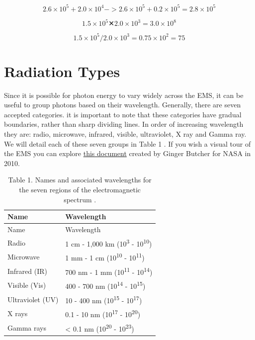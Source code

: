 \documentclass[
]{book}
\begin{document}
\begin{equation}
2.6 × 10 ^{5} + 2.0 × 10 ^{4}   ->
2.6 × 10 ^{5} + 0.2 × 10 ^{5} = 2.8 × 10 ^{5} 
\label{eq:SI-add}
\end{equation}

\begin{equation}
1.5 × 10 ^{5} ✕ 2.0 × 10 ^{3} = 3.0 × 10 ^{8} 
\label{eq:SI-multiply}
\end{equation}

\begin{equation}
1.5 × 10 ^{5} / 2.0 × 10 ^{3} = 0.75 × 10 ^{2} = 75
\label{eq:SI-divide}
\end{equation}

\hypertarget{radiation-types}{%
\section{Radiation Types}\label{radiation-types}}

Since it is possible for photon energy to vary widely across the
EMS, it can be useful to group photons based on their wavelength.
Generally, there are seven accepted categories. it is important to note
that these categories have gradual boundaries, rather than sharp
dividing lines. In order of increasing wavelength they are: radio,
microwave, infrared, visible, ultraviolet, X ray and Gamma ray. We will
detail each of these seven groups in Table 1 \citep{zwinkels_encyclopedia_2020}. If you
wish a visual tour of the EMS you can explore \href{https://books.google.ca/books?id=DfLPpxogdM4C\&pg=PP1\#v=onepage\&q\&f=false}{this
document}
created by Ginger Butcher for NASA in 2010.

\begin{longtable}[]{@{}ll@{}}
\caption{Table 1. Names and associated wavelengths for the seven regions of the
electromagnetic spectrum \citep{zwinkels_encyclopedia_2020}.}\tabularnewline
\toprule\noalign{}
Name & Wavelength \\
\midrule\noalign{}
\endfirsthead
\toprule\noalign{}
Name & Wavelength \\
\midrule\noalign{}
\endhead
\bottomrule\noalign{}
\endlastfoot
Radio & 1 cm - 1,000 km (10\textsuperscript{3} - 10\textsuperscript{10}) \\
Microwave & 1 mm - 1 cm (10\textsuperscript{10} - 10\textsuperscript{11}) \\
Infrared (IR) & 700 nm - 1 mm (10\textsuperscript{11} - 10\textsuperscript{14}) \\
Visible (Vis) & 400 - 700 nm (10\textsuperscript{14} - 10\textsuperscript{15}) \\
Ultraviolet (UV) & 10 - 400 nm (10\textsuperscript{15} - 10\textsuperscript{17}) \\
X rays & 0.1 - 10 nm (10\textsuperscript{17} - 10\textsuperscript{20}) \\
Gamma rays & \textless{} 0.1 nm (10\textsuperscript{20} - 10\textsuperscript{23}) \\
\end{longtable}
\end{document}
